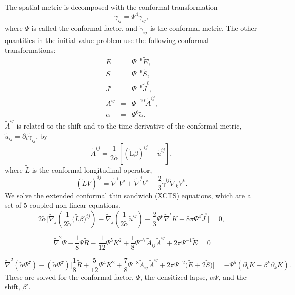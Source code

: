 The spatial metric is decomposed with the conformal transformation
\begin{equation}
\gamma_{ij}=\Psi^4\tilde{\gamma}_{ij},
\end{equation}
where $\Psi$ is called the conformal factor, and $\tilde{\gamma}_{ij}$
is the conformal metric. The other quantities in the initial value
problem use the following conformal transformations:
\begin{eqnarray}
E &=& \Psi^{-6}\tilde{E}, \\
S &=& \Psi^{-6}\tilde{S}, \\
J^i &=& \Psi^{-6}\tilde{J}^i, \\
A^{ij} &=& \Psi^{-10}\tilde{A}^{ij}, \\
\alpha &=& \Psi^{6}\tilde{\alpha}. 
\end{eqnarray}
$\tilde{A}^{ij}$ is related to the shift and to the time derivative of
the conformal metric, $\tilde{u}_{ij}=\partial_t\tilde{\gamma}_{ij}$,
by
\begin{equation}
\tilde{A}^{ij} =
\frac{1}{2\tilde{\alpha}}\left[\left(\tilde{\mathrm{L}}\beta\right)^{ij}-\tilde{u}^{ij}\right],
\end{equation}
where $\tilde{L}$ is the conformal longitudinal operator,
\begin{equation}
\left(\tilde{L}V\right)^{ij}=\tilde{\nabla}^iV^j + \tilde{\nabla}^jV^i
- \frac{2}{3}\tilde{\gamma}^{ij}\tilde{\nabla}_kV^k.
\end{equation}
We solve the extended conformal thin sandwich (XCTS) equations, which are a set of 5
coupled non-linear equations.
\begin{equation}
\label{eq:XCTS-Shift}
2\tilde{\alpha}\bigg[\tilde{\nabla}_j\left(\frac{1}{2\tilde{\alpha}}\big(\tilde{L}\beta\big)^{ij}\right)-\tilde{\nabla}_j\left(\frac{1}{2\tilde{\alpha}}\tilde{u}^{ij}\right)
-\frac{2}{3}\Psi^6\tilde{\nabla}^iK-8\pi\Psi^4\tilde{J}^i\bigg] =0,
\end{equation}

\begin{equation}
\label{eq:XCTS-ConformalFactor}
\tilde{\nabla}^2\Psi - \frac{1}{8}\Psi\tilde{R} -
\frac{1}{12}\Psi^5K^2 
+\frac{1}{8}\Psi^{-7}\tilde{A}_{ij}\tilde{A}^{ij} +
2\pi\Psi^{-1}\tilde{E}=0
\end{equation}

\begin{equation}
\label{eq:XCTS-Lapse}
\tilde{\nabla}^2\left(\tilde{\alpha}\Psi^7\right) -
\left(\tilde{\alpha}\Psi^7\right)\bigg[\frac{1}{8}\tilde{R}+\frac{5}{12}\Psi^4K^2+\frac{7}{8}\Psi^{-8}\tilde{A}_{ij}\tilde{A}^{ij}
+2\pi\Psi^{-2}\big(\tilde{E}+2\tilde{S}\big)\bigg]=-\Psi^5\left(\partial_{t}K
- \beta^{k}\partial_kK\right).
\end{equation}
These are solved
for the conformal factor, $\Psi$, the densitized lapse, $\alpha\Psi$,
and the shift, $\beta^i$.

